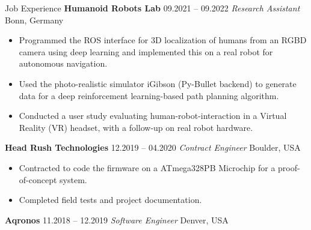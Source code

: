 \begin{rubric}{Job Experience}
%
%
\entry*[] \textbf{Humanoid Robots Lab} \hfill 09.2021 -- 09.2022 \newline
 \textit{Research Assistant} \hfill Bonn, Germany \newline 
\vspace{\CVItemizeHeaderSpacing} \begin{itemize}[leftmargin=*, rightmargin=1cm]
	\setlength{\itemsep}{\CVItemizeSpacing}
	\item Programmed the ROS interface for 3D localization of humans from an RGBD camera using deep learning and implemented this on a real robot for autonomous navigation.
	\item Used the photo-realistic simulator iGibson (Py-Bullet backend) to generate data for a deep reinforcement learning-based path planning algorithm. 
	\item Conducted a user study evaluating human-robot-interaction in a Virtual Reality (VR) headset, with a follow-up on real robot hardware.
\end{itemize}
%
%
\entry*[] \textbf{Head Rush Technologies} \hfill 12.2019 -- 04.2020 \newline
 \textit{Contract Engineer} \hfill Boulder, USA \newline 
\vspace{\CVItemizeHeaderSpacing} \begin{itemize}[leftmargin=*, rightmargin=1cm]
	\setlength{\itemsep}{\CVItemizeSpacing}
	\item Contracted to code the firmware on a ATmega328PB Microchip for a proof-of-concept system.  
	\item Completed field tests and project documentation.  
\end{itemize}
%
\entry*[] \textbf{Aqronos} \hfill 11.2018 -- 12.2019 \newline
\textit{Software Engineer} \hfill Denver, USA \newline
\vspace{\CVItemizeHeaderSpacing} \begin{itemize}[leftmargin=*, rightmargin=1cm]
	\setlength{\itemsep}{\CVItemizeSpacing}

\end{itemize}
\end{rubric}
